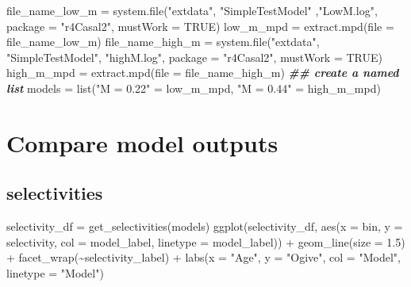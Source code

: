 \documentclass[
]{book}
\newenvironment{Shaded}{\begin{snugshade}}{\end{snugshade}}
\newcommand{\AttributeTok}[1]{\textcolor[rgb]{0.77,0.63,0.00}{#1}}
\newcommand{\ConstantTok}[1]{\textcolor[rgb]{0.00,0.00,0.00}{#1}}
\newcommand{\DocumentationTok}[1]{\textcolor[rgb]{0.56,0.35,0.01}{\textbf{\textit{#1}}}}
\newcommand{\FloatTok}[1]{\textcolor[rgb]{0.00,0.00,0.81}{#1}}
\newcommand{\FunctionTok}[1]{\textcolor[rgb]{0.00,0.00,0.00}{#1}}
\newcommand{\NormalTok}[1]{#1}
\newcommand{\OtherTok}[1]{\textcolor[rgb]{0.56,0.35,0.01}{#1}}
\newcommand{\SpecialCharTok}[1]{\textcolor[rgb]{0.00,0.00,0.00}{#1}}
\newcommand{\StringTok}[1]{\textcolor[rgb]{0.31,0.60,0.02}{#1}}
\begin{document}
\begin{Shaded}
\begin{Highlighting}[]
\NormalTok{file\_name\_low\_m }\OtherTok{=} \FunctionTok{system.file}\NormalTok{(}\StringTok{"extdata"}\NormalTok{, }\StringTok{"SimpleTestModel"}\NormalTok{ ,}\StringTok{"LowM.log"}\NormalTok{, }
                              \AttributeTok{package =} \StringTok{"r4Casal2"}\NormalTok{, }\AttributeTok{mustWork =} \ConstantTok{TRUE}\NormalTok{)}
\NormalTok{low\_m\_mpd }\OtherTok{=} \FunctionTok{extract.mpd}\NormalTok{(}\AttributeTok{file =}\NormalTok{ file\_name\_low\_m)}
\NormalTok{file\_name\_high\_m }\OtherTok{=} \FunctionTok{system.file}\NormalTok{(}\StringTok{"extdata"}\NormalTok{, }\StringTok{"SimpleTestModel"}\NormalTok{, }\StringTok{"highM.log"}\NormalTok{, }
                               \AttributeTok{package =} \StringTok{"r4Casal2"}\NormalTok{, }\AttributeTok{mustWork =} \ConstantTok{TRUE}\NormalTok{)}
\NormalTok{high\_m\_mpd }\OtherTok{=} \FunctionTok{extract.mpd}\NormalTok{(}\AttributeTok{file =}\NormalTok{ file\_name\_high\_m)}
\DocumentationTok{\#\# create a named list}
\NormalTok{models }\OtherTok{=} \FunctionTok{list}\NormalTok{(}\StringTok{"M = 0.22"} \OtherTok{=}\NormalTok{ low\_m\_mpd, }\StringTok{"M = 0.44"} \OtherTok{=}\NormalTok{ high\_m\_mpd)}
\end{Highlighting}
\end{Shaded}

\hypertarget{compare-model-outputs}{%
\section{Compare model outputs}\label{compare-model-outputs}}

\hypertarget{selectivities}{%
\subsection{selectivities}\label{selectivities}}

\begin{Shaded}
\begin{Highlighting}[]
\NormalTok{selectivity\_df }\OtherTok{=} \FunctionTok{get\_selectivities}\NormalTok{(models)}
\FunctionTok{ggplot}\NormalTok{(selectivity\_df, }\FunctionTok{aes}\NormalTok{(}\AttributeTok{x =}\NormalTok{ bin, }\AttributeTok{y =}\NormalTok{ selectivity, }\AttributeTok{col =}\NormalTok{ model\_label, }\AttributeTok{linetype =}\NormalTok{ model\_label)) }\SpecialCharTok{+}
  \FunctionTok{geom\_line}\NormalTok{(}\AttributeTok{size =} \FloatTok{1.5}\NormalTok{) }\SpecialCharTok{+}
  \FunctionTok{facet\_wrap}\NormalTok{(}\SpecialCharTok{\textasciitilde{}}\NormalTok{selectivity\_label) }\SpecialCharTok{+}
  \FunctionTok{labs}\NormalTok{(}\AttributeTok{x =} \StringTok{"Age"}\NormalTok{, }\AttributeTok{y =} \StringTok{"Ogive"}\NormalTok{, }\AttributeTok{col =} \StringTok{"Model"}\NormalTok{, }\AttributeTok{linetype =} \StringTok{"Model"}\NormalTok{)}
\end{Highlighting}
\end{Shaded}
\end{document}
